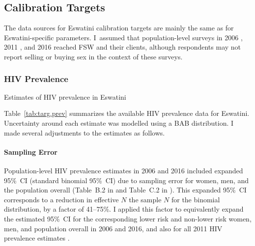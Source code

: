 \subsection{Calibration Targets}\label{model.cal.targ}
The data sources for Eswatini calibration targets
are mainly the same as for Eswatini-specific parameters.
I~assumed that population-level surveys in
2006 \cite{SDHS2006}, 2011 \cite{Bicego2013,Justman2016}, and 2016 \cite{SHIMS2}
reached FSW and their clients,
although respondents may not report selling or buying sex in the context of these surveys.
\subsubsection{HIV Prevalence}\label{model.cal.targ.prev}
\begin{table}
  \centering
  \caption{Estimates of HIV prevalence in Eswatini}
  \label{tab:targ.prev}
  
\end{table}
Table~\ref{tab:targ.prev} summarizes the available HIV prevalence data for Eswatini.
Uncertainty around each estimate was modelled using a BAB distribution.
I made several adjustments to the estimates as follows.
\paragraph{Sampling Error}
Population-level HIV prevalence estimates in 2006 and 2016 included
expanded 95\%~CI (\vs standard binomial 95\%~CI)
due to sampling error for women, men, and the population overall
(Table~B.2 in \cite{SDHS2006} and Table~C.2 in \cite{SHIMS2}).
This expanded 95\%~CI corresponds to a reduction in effective $N$ \vs the sample $N$
for the binomial distribution, by a factor of 41--75\%.
I applied this factor to equivalently expand the estimated 95\%~CI for
the corresponding lower risk and non-lower risk women, men, and population overall in 2006 and 2016,
and also for all 2011 HIV prevalence estimates \cite{Bicego2013}.

